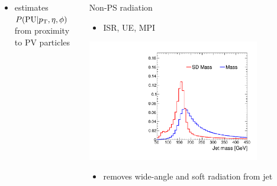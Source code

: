 \documentclass[aspectratio=169,xcolor=dvipsnames,,table,compress]{beamer}
\begin{document}
\begin{frame}[t]
\begin{columns}[T]
\begin{column}{0.33\textwidth}
      \vspace{-5mm}
  \begin{itemize}
    \item {\small {} estimates $P(\mathrm{PU}|p_\text{T},\eta,\phi)$ from proximity to PV particles}
  \end{itemize}
  \end{column}
  \pause 
  \begin{column}{0.33\textwidth}
    \centering 
    Non-PS radiation 
    \begin{itemize}
      \item {\small ISR, UE, MPI}
    \end{itemize}
      \includegraphics[width=0.8\textwidth]{../figures/toptagging/gen/compare_ZpTT_lo.pdf}
      \vspace{-3mm}
    \begin{itemize}
      \item {\small {} removes wide-angle and soft radiation from jet}
    \end{itemize}
  \end{column}
  \end{columns}
\end{frame}
\end{document}
